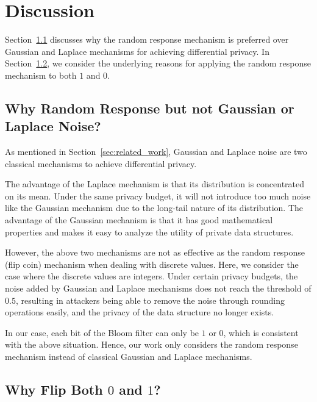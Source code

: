 


\section{Discussion} \label{sec:discussion}

Section~\ref{sec:flip_compare_gaussian_laplace} discusses why the random response mechanism is preferred over Gaussian and Laplace mechanisms for achieving differential privacy. 
In Section~\ref{sec:flip_both_directions}, we consider the underlying reasons for applying the random response mechanism to both $1$ and $0$.


\subsection{Why Random Response but not Gaussian or Laplace Noise?}\label{sec:flip_compare_gaussian_laplace}

As mentioned in Section~\ref{sec:related_work}, Gaussian and Laplace noise are two classical mechanisms to achieve differential privacy. 

The advantage of the Laplace mechanism is that its distribution is concentrated on its mean. Under the same privacy budget, it will not introduce too much noise like the Gaussian mechanism due to the long-tail nature of its distribution. The advantage of the Gaussian mechanism is that it has good mathematical properties and makes it easy to analyze the utility of private data structures.

However, the above two mechanisms are not as effective as the random response (flip coin) mechanism when dealing with discrete values. Here, we consider the case where the discrete values are integers. Under certain privacy budgets, the noise added by Gaussian and Laplace mechanisms does not reach the threshold of $0.5$, resulting in attackers being able to remove the noise through rounding operations easily, and the privacy of the data structure no longer exists.

In our case, each bit of the Bloom filter can only be $1$ or $0$, which is consistent with the above situation. Hence, our work only considers the random response mechanism instead of classical Gaussian and Laplace mechanisms.

\subsection{Why Flip Both \texorpdfstring{$0$}{} and \texorpdfstring{$1$}{}?} \label{sec:flip_both_directions}

